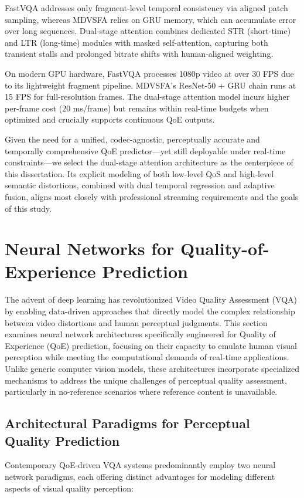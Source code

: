 FastVQA addresses only fragment-level temporal consistency via aligned patch sampling, whereas MDVSFA relies on GRU memory, which can accumulate error over long sequences. Dual-stage attention combines dedicated STR (short-time) and LTR (long-time) modules with masked self-attention, capturing both transient stalls and prolonged bitrate shifts with human-aligned weighting.  

On modern GPU hardware, FastVQA processes 1080p video at over 30 FPS due to its lightweight fragment pipeline. MDVSFA's ResNet-50 + GRU chain runs at 15 FPS for full-resolution frames. The dual-stage attention model incurs higher per-frame cost (20 ms/frame) but remains within real-time budgets when optimized and crucially supports continuous QoE outputs.

Given the need for a unified, codec-agnostic, perceptually accurate and temporally comprehensive QoE predictor—yet still deployable under real-time constraints—we select the dual-stage attention architecture as the centerpiece of this dissertation. Its explicit modeling of both low-level QoS and high-level semantic distortions, combined with dual temporal regression and adaptive fusion, aligns most closely with professional streaming requirements and the goals of this study.  

\section{Neural Networks for Quality-of-Experience Prediction}  
\label{sec:nn_qoe}  

The advent of deep learning has revolutionized Video Quality Assessment (VQA) by enabling data-driven approaches that directly model the complex relationship between video distortions and human perceptual judgments. This section examines neural network architectures specifically engineered for Quality of Experience (QoE) prediction, focusing on their capacity to emulate human visual perception while meeting the computational demands of real-time applications. Unlike generic computer vision models, these architectures incorporate specialized mechanisms to address the unique challenges of perceptual quality assessment, particularly in no-reference scenarios where reference content is unavailable.

\subsection{Architectural Paradigms for Perceptual Quality Prediction}  
Contemporary QoE-driven VQA systems predominantly employ two neural network paradigms, each offering distinct advantages for modeling different aspects of visual quality perception:

